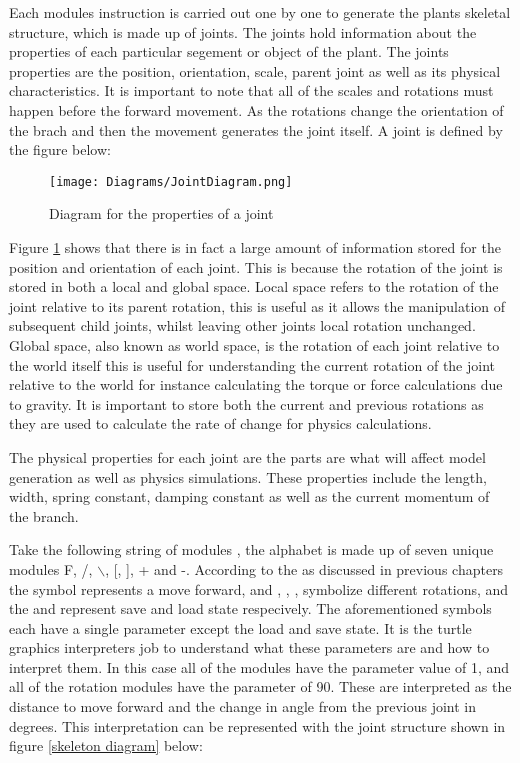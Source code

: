 \noindent
Each modules instruction is carried out one by one to generate the plants skeletal structure, which is made up of joints. The joints hold information about the properties of each particular segement or object of the plant. The joints properties are the position, orientation, scale, parent joint as well as its physical characteristics. It is important to note that all of the scales and rotations must happen before the forward movement. As the rotations change the orientation of the brach and then the movement generates the joint itself. A joint is defined by the figure below:

\begin{figure}[htbp]
	{\centering
		\vspace{7px}
		\texttt{[image: Diagrams/JointDiagram.png]}
		\caption{Diagram for the properties of a joint} \label{joint properties}
	}
\end{figure}
\FloatBarrier

\noindent
Figure \ref{joint properties} shows that there is in fact a large amount of information stored for the position and orientation of each joint. This is because the rotation of the joint is stored in both a local and global space. Local space refers to the rotation of the joint relative to its parent rotation, this is useful as it allows the manipulation of subsequent child joints, whilst leaving other joints local rotation unchanged. Global space, also known as world space, is the rotation of each joint relative to the world itself this is useful for understanding the current rotation of the joint relative to the world for instance calculating the torque or force calculations due to gravity. It is important to store both the current and previous rotations as they are used to calculate the rate of change for physics calculations.

The physical properties for each joint are the parts are what will affect model generation as well as physics simulations. These properties include the length, width, spring constant, damping constant as well as the current momentum of the branch. 

Take the following string of modules , the alphabet is made up of seven unique modules F, /, $\backslash$, [, ], + and -. According to the as discussed in previous chapters the  symbol represents a move forward, and \say{+}, \say{-}, \say{/}, \say{$\backslash$} symbolize different rotations, and the \say{[} and \say{]} represent save and load state respecively. The aforementioned symbols each have a single parameter except the load and save state. It is the turtle graphics interpreters job to understand what these parameters are and how to interpret them. In this case all of the  modules have the parameter value of 1, and all of the rotation modules have the parameter of 90. These are interpreted as the distance to move forward and the change in angle from the previous joint in degrees. This interpretation can be represented with the joint structure shown in figure \ref{skeleton diagram} below:


